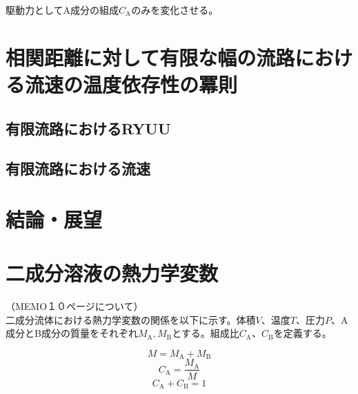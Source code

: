 \documentclass[a4paper,12pt, oneside, openany]{jsbook}
\begin{document}
駆動力としてA成分の組成$C_\mathrm{A}$のみを変化させる。










\newpage
\chapter{相関距離に対して有限な幅の流路における流速の温度依存性の冪則}
\section{有限流路におけるRYUU}


\section{有限流路における流速}




\newpage
\chapter{結論・展望}

\appendix
\newpage
\chapter{二成分溶液の熱力学変数}
\noindent（MEMO１０ページについて）\\
\noindent
二成分流体における熱力学変数の関係を以下に示す。体積$V$、温度$T$、圧力$P$、A成分とB成分の質量をそれぞれ$M_\mathrm{A},M_\mathrm{B}$とする。組成比$ C_\mathrm{A}$、$C_\mathrm{B}$を定義する。

\begin{equation}\label{situryou}
  M=M_\mathrm{A}+M_\mathrm{B}
\end{equation}
\begin{equation}\label{soseiA}
  C_\mathrm{A}=\frac{M_\mathrm{A}}{M}
\end{equation}
\begin{equation}\label{soseihi}
  C_\mathrm{A}+C_\mathrm{B}=1
\end{equation}
\end{document}
